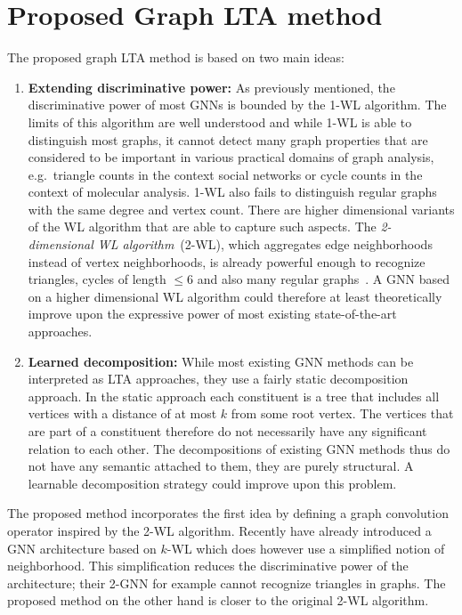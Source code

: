 \documentclass[12pt]{scrartcl}
\begin{document}
\section{Proposed Graph LTA method}%
\label{sec:graph-lta}

The proposed graph LTA method is based on two main ideas:
\begin{enumerate}[label=\textbf{\arabic*.}]
	\item \textbf{Extending discriminative power:}
		As previously mentioned, the discriminative power of most GNNs is bounded by the 1-WL algorithm.
		The limits of this algorithm are well understood and while 1-WL is able to distinguish most graphs, it cannot detect many graph properties that are considered to be important in various practical domains of graph analysis, e.g.\ triangle counts in the context social networks or cycle counts in the context of molecular analysis.
		1-WL also fails to distinguish regular graphs with the same degree and vertex count.
		There are higher dimensional variants of the WL algorithm that are able to capture such aspects.
		The \textit{2-dimensional WL algorithm}~(2-WL), which aggregates edge neighborhoods instead of vertex neighborhoods, is already powerful enough to recognize triangles, cycles of length $\leq 6$ and also many regular graphs~\cite{Fuerer2017}.
		A GNN based on a higher dimensional WL algorithm could therefore at least theoretically improve upon the expressive power of most existing state-of-the-art approaches.
	\item \textbf{Learned decomposition:}
		While most existing GNN methods can be interpreted as LTA approaches, they use a fairly static decomposition approach.
		In the static approach each constituent is a tree that includes all vertices with a distance of at most $k$ from some root vertex.
		The vertices that are part of a constituent therefore do not necessarily have any significant relation to each other.
		The decompositions of existing GNN methods thus do not have any semantic attached to them, they are purely structural.
		A learnable decomposition strategy could improve upon this problem.
\end{enumerate}

The proposed method incorporates the first idea by defining a graph convolution operator inspired by the 2-WL algorithm.
Recently \citet{Morris2018} have already introduced a GNN architecture based on $k$-WL which does however use a simplified notion of neighborhood.
This simplification reduces the discriminative power of the architecture; their 2-GNN for example cannot recognize triangles in graphs.
The proposed method on the other hand is closer to the original 2-WL algorithm.
\end{document}
